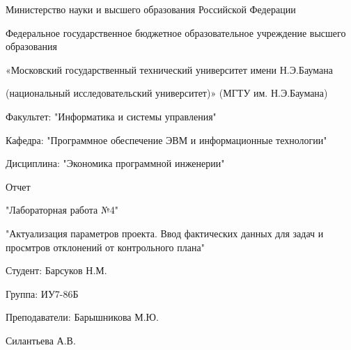 \begin{center}
	Министерство науки и высшего образования Российской Федерации
	
	
	Федеральное государственное бюджетное образовательное учреждение высшего образования
	
	
	«Московский государственный технический университет имени Н.Э.Баумана
	
	
	(национальный исследовательский университет)» (МГТУ им. Н.Э.Баумана)
\end{center}

\vspace{8ex}

\begin{flushleft}
	Факультет: "Информатика и системы управления"
	
	Кафедра: "Программное обеспечение ЭВМ и информационные технологии"
	
	Дисциплина: "Экономика программной инженерии"
\end{flushleft}
\vspace{5ex}
\begin{center}
	Отчет
	
	"Лабораторная работа №4"
	
	"Актуализация параметров проекта. Ввод фактических данных для задач и просмтров отклонений от контрольного плана"
\end{center}

\vspace{5ex}

\begin{flushright}
	Студент: Барсуков Н.М.
	
	Группа: ИУ7-86Б
	
	Преподаватели: Барышникова М.Ю. 
	
	Силантьева А.В.
\end{flushright}